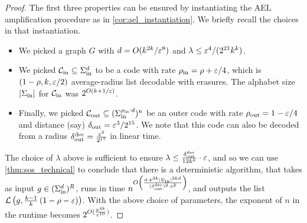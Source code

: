 \begin{proof}
	The first three properties can be ensured by instantiating the AEL amplification procedure as in \cref{cor:ael_instantiation}. We briefly recall the choices in that instantiation.
	
	\begin{itemize}
		\item We picked a graph $G$ with $d = O(k^{2k}/\varepsilon^8)$ and $\lambda \leq \varepsilon^4/(2^{21} k^k)$. 
%
		\item We picked ${\mathcal C}_{\mathrm{in}} \subseteq \Sigma_{\mathrm{in}}^d$ to be a code with rate $\rho_{\mathrm{in}} = \rho + \varepsilon/4$, which is $(1 - \rho, k, \varepsilon/2)$ average-radius list decodable with erasures. The alphabet size $|\Sigma_{\mathrm{in}}|$ for ${\mathcal C}_{\mathrm{in}}$ was $2^{O(k + 1/\varepsilon)}$.
%
		\item Finally, we picked ${\mathcal C}_{\mathrm{out}} \subseteq (\Sigma_{\mathrm{in}}^{\rho_{\mathrm{in}} \cdot d})^n$ be an outer code with rate $\rho_{\mathrm{out}} = 1 - \varepsilon/4$ and distance (say) $\delta_{\mathrm{out}} = \varepsilon^3/2^{15}$. We note that this code can also be decoded from a radius $\delta_{\mathrm{out}}^{\mathrm{dec}} = \frac{\varepsilon^3}{2^{17}}$ \cite{Zemor01, GRS23} in linear time.
	\end{itemize}
%

The choice of $\lambda$ above is sufficient to ensure $\lambda \leq \frac{\delta_{\mathrm{out}}^{\mathrm{dec}}}{12k^k}\cdot \varepsilon$, and so we can use \cref{thm:sos_technical} to conclude that there is a deterministic algorithm, that takes as input $g\in (\Sigma_{\mathrm{in}}^d)^R$, runs in time $n^{O\left( \frac{d \cdot k^{3k}|\Sigma_{\mathrm{in}}|^{3kd}}{(\delta_{\mathrm{out}}^{\mathrm{dec}})^2\cdot \varepsilon^2}\right)}$, and outputs the list ${\mathcal L}\left(g,\frac{k-1}{k}\left(1-\rho-\varepsilon\right)\right)$. With the above choice of parameters, the exponent of $n$ in the runtime becomes $2^{O(\frac{k^{4k}}{\varepsilon^{10}})}$.
%
%
\end{proof}